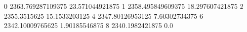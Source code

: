 0 2363.769287109375 23.571044921875
1 2358.495849609375 18.297607421875
2 2355.3515625 15.1533203125
4 2347.80126953125 7.60302734375
6 2342.10009765625 1.90185546875
8 2340.1982421875 0.0
